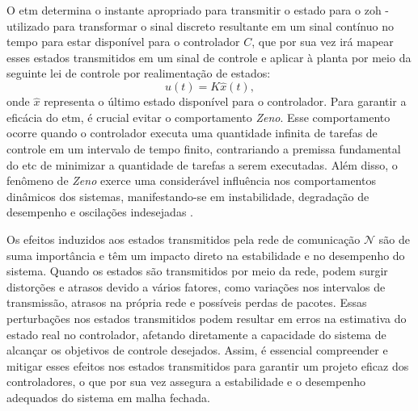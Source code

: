 O \acrshort{etm} determina o instante apropriado para transmitir o estado para o \acrfull{zoh} - utilizado para transformar o sinal discreto resultante em um sinal contínuo no tempo para estar disponível para o controlador $C$, que por sua vez irá mapear esses estados transmitidos em um sinal de controle e aplicar à planta por meio da seguinte lei de controle por realimentação de estados: \begin{equation}u(t) = K \hat{x}(t),\end{equation} onde $\hat{x}$ representa o último estado disponível para o controlador. Para garantir a eficácia do \acrshort{etm}, é crucial evitar o comportamento \textit{Zeno}. Esse comportamento ocorre quando o controlador executa uma quantidade infinita de tarefas de controle em um intervalo de tempo finito, contrariando a premissa fundamental do \acrshort{etc} de minimizar a quantidade de tarefas a serem executadas. Além disso, o fenômeno de \textit{Zeno} exerce uma considerável influência nos comportamentos dinâmicos dos sistemas, manifestando-se em instabilidade, degradação de desempenho e oscilações indesejadas \citep{Yang2024}.

Os efeitos induzidos aos estados transmitidos pela rede de comunicação $\mathcal{N}$ são de suma importância e têm um impacto direto na estabilidade e no desempenho do sistema. Quando os estados são transmitidos por meio da rede, podem surgir distorções e atrasos devido a vários fatores, como variações nos intervalos de transmissão, atrasos na própria rede e possíveis perdas de pacotes. Essas perturbações nos estados transmitidos podem resultar em erros na estimativa do estado real no controlador, afetando diretamente a capacidade do sistema de alcançar os objetivos de controle desejados. Assim, é essencial compreender e mitigar esses efeitos nos estados transmitidos para garantir um projeto eficaz dos controladores, o que por sua vez assegura a estabilidade e o desempenho adequados do sistema em malha fechada.


